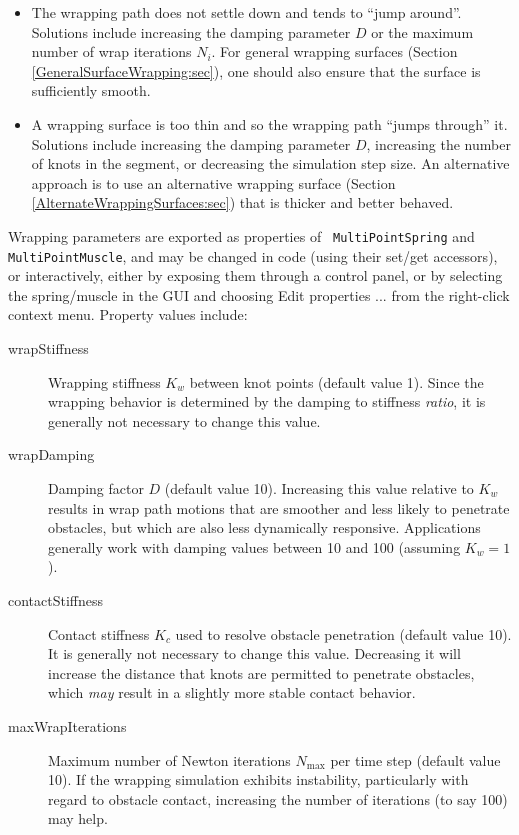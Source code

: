 \begin{itemize}

\item The wrapping path does not settle down and tends to ``jump
around''.  Solutions include increasing the damping parameter $D$ or
the maximum number of wrap iterations $N_i$. For general wrapping
surfaces (Section \ref{GeneralSurfaceWrapping:sec}), one should also
ensure that the surface is sufficiently smooth.

\item A wrapping surface is too thin and so the wrapping
path ``jumps through'' it. Solutions include increasing the damping
parameter $D$, increasing the number of knots in the segment, or
decreasing the simulation step size. An alternative approach is to use
an alternative wrapping surface
(Section \ref{AlternateWrappingSurfaces:sec}) that is thicker and
better behaved.

\end{itemize}

Wrapping parameters are exported as properties of {\tt
MultiPointSpring} and {\tt MultiPointMuscle}, and may be changed in
code (using their set/get accessors), or interactively,
either by exposing them through a control panel,
or by selecting the spring/muscle in the GUI and choosing {\sf Edit
properties ...} from the right-click context menu.  Property values
include:

\begin{description}

\item[wrapStiffness] Wrapping stiffness $K_w$ between knot points
(default value 1). Since the wrapping behavior is determined by the
damping to stiffness {\it ratio}, it is generally not necessary to
change this value.

\item[wrapDamping] Damping factor $D$ (default
value 10). Increasing this value relative to $K_w$ results in wrap
path motions that are smoother and less likely to penetrate obstacles,
but which are also less dynamically responsive. Applications generally
work with damping values between 10 and 100 (assuming $K_w = 1$).

\item[contactStiffness] Contact stiffness $K_c$ used to resolve obstacle
penetration (default value 10). It is generally not necessary
to change this value. Decreasing it will increase the distance that
knots are permitted to penetrate obstacles, which {\it may} result in
a slightly more stable contact behavior.

\item[maxWrapIterations] Maximum number of Newton iterations
$N_\text{max}$ per time step (default value 10). If the wrapping
simulation exhibits instability, particularly with regard to obstacle
contact, increasing the number of iterations (to say 100) may help.

\end{description}

